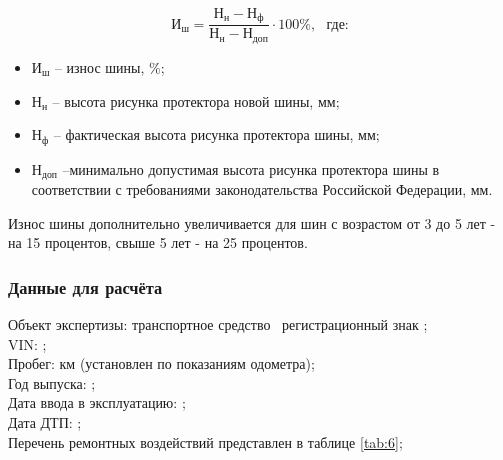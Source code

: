 \begin{equation}\label{eq:sh}
\text{И}_{\text{ш}} = \frac{\text{Н}_{\text{н}}-\text{Н}_{\text{ф}}}{\text{Н}_{\text{н}}-\text{Н}_{\text{доп}}} \cdot{100}\%,  \,\,\,\,\text{где:} 
\end{equation}
%
\begin{itemize}
	\item[ ] $ \text{И}_{\text{ш}} $ -- износ шины, \%;
	\item[ ] $ \text{Н}_{\text{н}} $ -- высота рисунка протектора новой шины, мм;
	\item[ ] $\text{Н}_{\text{ф}} $ -- фактическая высота рисунка протектора шины, мм;
	\item[ ] $ \text{Н}_{\text{доп}} $ --минимально допустимая высота рисунка протектора шины в соответствии с требованиями законодательства Российской Федерации, мм.
\end{itemize}
%
\vspace{5mm}
\relax
%
Износ шины дополнительно увеличивается для шин с возрастом от 3 до 5 лет - на 15 процентов, свыше 5 лет - на 25 процентов.

                                                 
\subsubsection{Данные для расчёта}

\noindent Объект экспертизы:  транспортное средство \tc\,
регистрационный знак ;\\ 
VIN: ;\\
Пробег:     км (установлен по показаниям одометра);\\
Год выпуска:     ;\\ 
Дата ввода в эксплуатацию:  ;\\
Дата ДТП:  ;\\
Перечень ремонтных воздействий представлен в таблице \ref{tab:6};\\
%
%
%   
%  
\pagebreak
